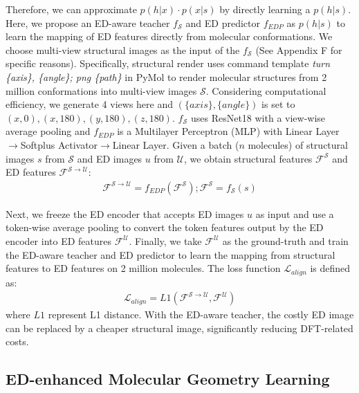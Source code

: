 \documentclass{article}
\begin{document}
Therefore, we can approximate $p(h|x)\cdot p(x|s)$ by directly learning a $p(h|s)$. Here, we propose an ED-aware teacher $f_{\mathcal{S}}$ and ED predictor $f_{EDP}$ as $p(h|s)$ to learn the mapping of ED features directly from molecular conformations. We choose multi-view structural images as the input of the $f_{\mathcal{S}}$ (See Appendix F for specific reasons). Specifically, structural render uses command template \textit{turn \{axis\}, \{angle\}; png \{path\}} in PyMol to render molecular structures from 2 million conformations into multi-view images $\mathcal{S}$. Considering computational efficiency, we generate 4 views here and $(\{axis\}, \{angle\})$ is set to $(x, 0), (x, 180), (y, 180), (z, 180)$. $f_{\mathcal{S}}$ uses ResNet18 \cite{he2016deep} with a view-wise average pooling and $f_{EDP}$ is a Multilayer Perceptron (MLP) with Linear Layer$\rightarrow$Softplus Activator$\rightarrow$Linear Layer. Given a batch ($n$ molecules) of structural images $s$ from $\mathcal{S}$ and ED images $u$ from $\mathcal{U}$, we obtain structural features $\mathcal{F}^{\mathcal{S}}$ and ED features $\mathcal{F}^{\mathcal{S}\rightarrow\mathcal{U}}$:
\begin{align}
\label{Formula_F_S_U_and_F_S}
\mathcal{F}^{\mathcal{S}\rightarrow\mathcal{U}}=f_{EDP}(\mathcal{F}^{\mathcal{S}}); \mathcal{F}^{\mathcal{S}}=f_{\mathcal{S}}(s)
\end{align}

Next, we freeze the ED encoder that accepts ED images $u$ as input and use a token-wise average pooling to convert the token features output by the ED encoder into ED features $\mathcal{F}^{\mathcal{U}}$. Finally, we take $\mathcal{F}^{\mathcal{U}}$ as the ground-truth and train the ED-aware teacher and ED predictor to learn the mapping from structural features to ED features on 2 million molecules. The loss function $\mathcal{L}_{align}$ is defined as:
\begin{align}
\label{Formula_L_align}
\mathcal{L}_{align}=L1(\mathcal{F}^{\mathcal{S}\rightarrow\mathcal{U}}, \mathcal{F}^{\mathcal{U}})
\end{align}
where $L1$ represent L1 distance. With the ED-aware teacher, the costly ED image can be replaced by a cheaper structural image, significantly reducing DFT-related costs. %



\subsection{ED-enhanced Molecular Geometry Learning}
\label{sec:ED-enhanced_Molecular_Geometry_Learning}
\end{document}
